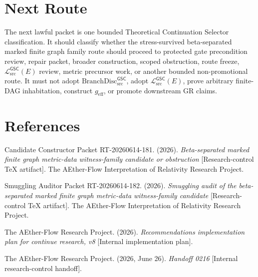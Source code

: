 \documentclass[11pt]{article}
\newcommand{\MetricData}{\mathcal{L}_{\mathrm{src}}^{\mathsf{GSC}}}
\newcommand{\geff}{g_{\mathrm{eff}}}
\newcommand{\BranchDisc}{\mathrm{BranchDisc}_{\mathrm{src}}^{\mathsf{GSC}}}
\begin{document}
\section{Next Route}

The next lawful packet is one bounded Theoretical Continuation Selector
classification. It should classify whether the stress-survived beta-separated
marked finite graph family route should proceed to protected gate precondition
review, repair packet, broader construction, scoped obstruction, route freeze,
\(\MetricData(E)\) review, metric precursor work, or another bounded
non-promotional route. It must not adopt \(\BranchDisc\), adopt
\(\MetricData(E)\), prove arbitrary finite-DAG inhabitation, construct
\(\geff\), or promote downstream GR claims.

\section*{References}

Candidate Constructor Packet RT-20260614-181. (2026). \textit{Beta-separated
marked finite graph metric-data witness-family candidate or obstruction}
[Research-control TeX artifact]. The AEther-Flow Interpretation of Relativity
Research Project.

Smuggling Auditor Packet RT-20260614-182. (2026). \textit{Smuggling audit of
the beta-separated marked finite graph metric-data witness-family candidate}
[Research-control TeX artifact]. The AEther-Flow Interpretation of Relativity
Research Project.

The AEther-Flow Research Project. (2026). \textit{Recommendations
implementation plan for continue research, v8} [Internal implementation
plan].

The AEther-Flow Research Project. (2026, June 26). \textit{Handoff 0216}
[Internal research-control handoff].
\end{document}
